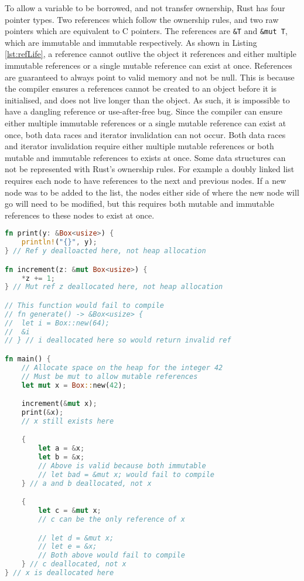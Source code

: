 \documentclass[10pt,a4paper,twocolumn]{article}
\begin{document}
To allow a variable to be borrowed, and not transfer ownership, Rust has four pointer types.
Two references which follow the ownership rules, and two raw pointers which are equivalent to C
pointers.
The references are \lstinline{&T} and \lstinline{&mut T}, which are immutable and immutable
respectively.
As shown in Listing \ref{lst:refLife}, a reference cannot outlive the object it references and
either multiple immutable references or a single mutable reference can exist at once.
References are guaranteed to always point to valid memory and not be null.
This is because the compiler ensures a references cannot be created to an object before it is
initialised, and does not live longer than the object.
As such, it is impossible to have a dangling reference or use-after-free bug.
Since the compiler can ensure either multiple immutable references or a single mutable reference
can exist at once, both data races and iterator invalidation can not occur.
Both data races and iterator invalidation require either multiple mutable references or both
mutable and immutable references to exists at once.
Some data structures can not be represented with Rust's ownership rules.
For example a doubly linked list requires each node to have references to the next and previous
nodes.
If a new node was to be added to the list, the nodes either side of where the new node will go
will need to be modified, but this requires both mutable and immutable references to these nodes
to exist at once.

\begin{lstlisting}[language=Rust, float=h, label=lst:refLife, caption={A short example of the
	lifetime of references and how only immutable references or a mutable reference can exist
	at once}]
fn print(y: &Box<usize>) {
	println!("{}", y);
} // Ref y dealloacted here, not heap allocation

fn increment(z: &mut Box<usize>) {
	*z += 1;
} // Mut ref z deallocated here, not heap allocation

// This function would fail to compile
// fn generate() -> &Box<usize> {
//	let i = Box::new(64);
//	&i
// } // i deallocated here so would return invalid ref

fn main() {
	// Allocate space on the heap for the integer 42
	// Must be mut to allow mutable references
	let mut x = Box::new(42);

	increment(&mut x);
	print(&x);
	// x still exists here

	{
		let a = &x;
		let b = &x;
		// Above is valid because both immutable
		// let bad = &mut x; would fail to compile
	} // a and b deallocated, not x

	{
		let c = &mut x;
		// c can be the only reference of x

		// let d = &mut x;
		// let e = &x;
		// Both above would fail to compile
	} // c deallocated, not x
} // x is deallocated here
\end{lstlisting}
\end{document}
